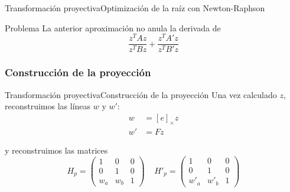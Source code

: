 \documentclass[aspectratio=169,14pt,spanish]{beamer}
\begin{document}
        \begin{frame}{Transformación proyectiva}{Optimización de la raíz con Newton-Raphson}

            \begin{alertblock}{Problema}
                La anterior aproximación no anula la derivada de \[\frac{z^T Az}{z^T Bz} + \frac{z^T A'z}{z^T B'z}\]

            \end{alertblock}


        \end{frame}
        \subsubsection{Construcción de la proyección}

          \begin{frame}{Transformación proyectiva}{Construcción de la proyección}
              Una vez calculado $z$, reconstruimos las líneas  $w$ y $w'$:
              \begin{align*}
                w &= [e]_\times z\\
                w' &= Fz
              \end{align*}

              y reconstruimos las matrices \[H_p =
              \begin{pmatrix}
                  1 & 0 & 0 \\
                  0 & 1 & 0 \\
                  w_a & w_b & 1
              \end{pmatrix}\;\;\;\;
              H'_p =
              \begin{pmatrix}
                  1 & 0 & 0 \\
                  0 & 1 & 0 \\
                  w'_a & w'_b & 1
              \end{pmatrix}\]
          \end{frame}
\end{document}
